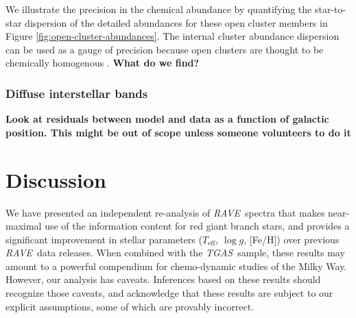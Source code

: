 \documentclass[preprint,trackchanges]{aastex}
\newcommand{\acronym}[1]{{\small{#1}}}
\newcommand{\project}[1]{\textsl{#1}}
\newcommand{\rave}{\project{\acronym{RAVE}}}
\newcommand{\tgas}{\project{\acronym{TGAS}}}
\newcommand{\stub}[1]{{\color{blue} \textbf{#1}}}
\newcommand{\teff}{T_{\mathrm{eff}}}
\newcommand{\logg}{\log g}
\begin{document}
We illustrate the precision in the chemical abundance by quantifying the star-to-star dispersion of  the detailed abundances for these open cluster members in
Figure \ref{fig:open-cluster-abundances}.  The internal cluster abundance dispersion can be used as a gauge of precision because open clusters are thought to be chemically homogenous \citep[e.g.][]{Bovy_2016}. 
\stub{What do we find?}

 

\subsubsection{Diffuse interstellar bands}
\label{sec:dibs-validation}

\stub{Look at residuals between model and data as a function of galactic position. This might be out of scope unless someone volunteers to do it}


\section{Discussion}
\label{sec:discussion}


We have presented an independent re-analysis of \rave\ spectra that makes near-maximal
use of the information content for red giant branch stars, and provides a significant
improvement in stellar parameters ($\teff$, $\logg$, [Fe/H]) over previous \rave\ data
releases.  When combined with the \tgas\ sample, these results may amount to a powerful
compendium for chemo-dynamic studies of the Milky Way.  However, our analysis has caveats.
Inferences based on these results should recognize those caveats, and acknowledge that 
these results are subject to our explicit assumptions, some of which are provably
incorrect.
\end{document}
